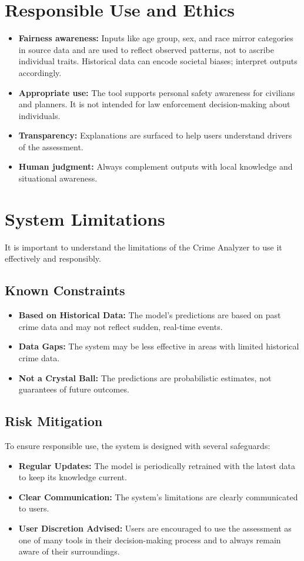\documentclass[11pt]{article}
\begin{document}
\section{Responsible Use and Ethics}
\begin{itemize}[leftmargin=*]
\item \textbf{Fairness awareness:} Inputs like age group, sex, and race mirror categories in source data and are used to reflect observed patterns, not to ascribe individual traits. Historical data can encode societal biases; interpret outputs accordingly.
\item \textbf{Appropriate use:} The tool supports personal safety awareness for civilians and planners. It is not intended for law enforcement decision-making about individuals.
\item \textbf{Transparency:} Explanations are surfaced to help users understand drivers of the assessment.
\item \textbf{Human judgment:} Always complement outputs with local knowledge and situational awareness.
\end{itemize}

\section{System Limitations}
It is important to understand the limitations of the Crime Analyzer to use it effectively and responsibly.

\subsection{Known Constraints}
\begin{itemize}[leftmargin=*]
\item \textbf{Based on Historical Data:} The model's predictions are based on past crime data and may not reflect sudden, real-time events.
\item \textbf{Data Gaps:} The system may be less effective in areas with limited historical crime data.
\item \textbf{Not a Crystal Ball:} The predictions are probabilistic estimates, not guarantees of future outcomes.
\end{itemize}

\subsection{Risk Mitigation}
To ensure responsible use, the system is designed with several safeguards:
\begin{itemize}[leftmargin=*]
\item \textbf{Regular Updates:} The model is periodically retrained with the latest data to keep its knowledge current.
\item \textbf{Clear Communication:} The system's limitations are clearly communicated to users.
\item \textbf{User Discretion Advised:} Users are encouraged to use the assessment as one of many tools in their decision-making process and to always remain aware of their surroundings.
\end{itemize}
\end{document}
